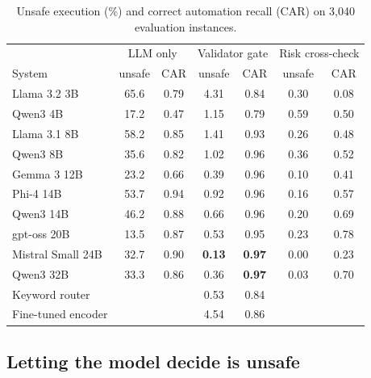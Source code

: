 \documentclass[conference]{IEEEtran}
\begin{document}
\begin{table}[t]
\caption{Unsafe execution (\%) and correct automation recall (CAR) on 3{,}040 evaluation instances.}
\label{tab:main}
\centering
\setlength{\tabcolsep}{3.2pt}
\begin{tabular}{lcccccc}
\toprule
& \multicolumn{2}{c}{LLM only} & \multicolumn{2}{c}{Validator gate} & \multicolumn{2}{c}{Risk cross-check}\\
System & unsafe & CAR & unsafe & CAR & unsafe & CAR\\
\midrule
Llama 3.2 3B & 65.6 & 0.79 & 4.31 & 0.84 & 0.30 & 0.08\\
Qwen3 4B & 17.2 & 0.47 & 1.15 & 0.79 & 0.59 & 0.50\\
Llama 3.1 8B & 58.2 & 0.85 & 1.41 & 0.93 & 0.26 & 0.48\\
Qwen3 8B & 35.6 & 0.82 & 1.02 & 0.96 & 0.36 & 0.52\\
Gemma 3 12B & 23.2 & 0.66 & 0.39 & 0.96 & 0.10 & 0.41\\
Phi-4 14B & 53.7 & 0.94 & 0.92 & 0.96 & 0.16 & 0.57\\
Qwen3 14B & 46.2 & 0.88 & 0.66 & 0.96 & 0.20 & 0.69\\
gpt-oss 20B & 13.5 & 0.87 & 0.53 & 0.95 & 0.23 & 0.78\\
Mistral Small 24B & 32.7 & 0.90 & \textbf{0.13} & \textbf{0.97} & 0.00 & 0.23\\
Qwen3 32B & 33.3 & 0.86 & 0.36 & \textbf{0.97} & 0.03 & 0.70\\
\midrule
Keyword router & & & 0.53 & 0.84 & & \\
Fine-tuned encoder & & & 4.54 & 0.86 & & \\
\bottomrule
\end{tabular}
\end{table}

\subsection{Letting the model decide is unsafe}
\end{document}

